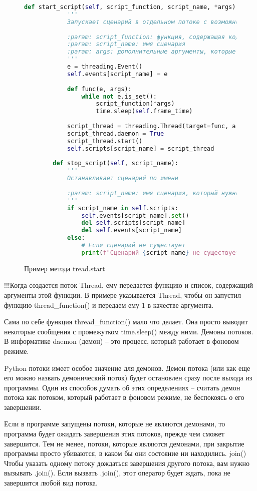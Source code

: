 \begin{figure}[H]
	\begin{lstlisting}[language=Python]
		def start_script(self, script_function, script_name, *args):
			'''
			Запускает сценарий в отдельном потоке с возможностью остановки и передачи аргументов.
			
			:param: script_function: функция, содержащая код сценария
			:param: script_name: имя сценария
			:param: args: дополнительные аргументы, которые передаются в сценарий
			'''
			e = threading.Event()
			self.events[script_name] = e
			
			def func(e, args):
				while not e.is_set():
					script_function(*args)
					time.sleep(self.frame_time)
			
			script_thread = threading.Thread(target=func, args=(e, args))
			script_thread.daemon = True
			script_thread.start()
			self.scripts[script_name] = script_thread
		
		def stop_script(self, script_name):
			'''
			Останавливает сценарий по имени
			
			:param: script_name: имя сценария, который нужно остановить
			'''
			if script_name in self.scripts:
				self.events[script_name].set()
				del self.scripts[script_name]
				del self.events[script_name]
			else:
				# Если сценарий не существует
				print(f"Сценарий {script_name} не существует.")
	\end{lstlisting}  
	\caption{Пример метода tread.start}
	\label{treading:image}
\end{figure}
!!!Когда создается поток Thread, ему передается функцию и список, содержащий аргументы этой функции. В примере указывается Thread, чтобы он запустил функцию thread\_function() и передаем ему 1 в качестве аргумента.

Сама по себе функция thread\_function() мало что делает. Она просто выводит некоторые сообщения с промежутком time.sleep() между ними.
Демоны потоков.
В информатике daemon (демон) – это процесс, который работает в фоновом режиме.

Python потоки имеет особое значение для демонов. Демон потока (или как еще его можно назвать демонический поток) будет остановлен сразу после выхода из программы. Один из способов думать об этих определениях – считать демон потока как потоком, который работает в фоновом режиме, не беспокоясь о его завершении.

Если в программе запущены потоки, которые не являются демонами, то программа будет ожидать завершения этих потоков, прежде чем сможет завершится. Тем не менее, потоки, которые являются демонами, при закрытие программы просто убиваются, в каком бы они состояние ни находились.
join()
Чтобы указать одному потоку дождаться завершения другого потока, вам нужно вызывать .join().  Если вызвать .join(), этот оператор будет ждать, пока не завершится любой вид потока.


